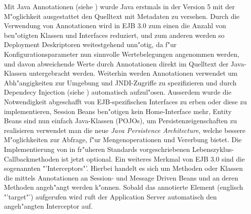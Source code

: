 Mit Java Annotationen (siehe \cite{JAVAANNOTATIONS}) wurde Java erstmals in der Version 5 mit der M"oglichkeit ausgestattet 
den Quelltext mit Metadaten zu versehen.
Durch die Verwendung von Annotationen wird in EJB 3.0 zum einen die Anzahl von ben"otigten Klassen und Interfaces reduziert,
und zum anderen werden so Deployment Deskriptoren weitestgehend unn"otig, da f"ur Konfigurationsparameter nun sinnvolle Wertebelegungen
angenommen werden, und davon abweichende Werte durch Annotationen direkt im Quelltext der Java-Klassen untergebracht werden.
Weiterhin werden Annotationen verwendet um Abh"angigkeiten zur Umgebung und JNDI-Zugriffe zu spezifizieren und durch
Dependecy Injection (siehe \cite{DEPINJ}) automatisch aufzul"osen.
Ausserdem wurde die Notwendigkeit abgeschafft von EJB-spezifischen Interfaces zu erben oder diese zu implementieren, Session Beans
ben"otigen kein Home-Interface mehr, Entity Beans sind nun einfach Java-Klassen (POJOs), um Persistenzeigenschaften zu realisieren
verwendet man die neue \emph{Java Persistence Architecture}, welche bessere M"oglichkeiten zur Abfrage, f"ur Mengenoperationen und
Vererbung bietet. Die Implementierung von in fr"uheren Standards vorgeschriebenen Lebenszyklus-Callbackmethoden ist jetzt optional.
Ein weiteres Merkmal von EJB 3.0 sind die sogenannten "'Interceptors"'. Hierbei handelt es sich um Methoden oder Klassen die mittels
Annotationen an Session- und Message Driven Beans und an deren Methoden angeh"angt werden k"onnen. Sobald das annotierte Element 
(englisch "'target"') aufgerufen wird ruft der Application Server automatisch den angeh"angten Interceptor auf.




